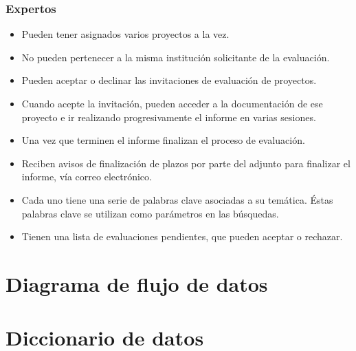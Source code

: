 \documentclass[12pt,a4paper,spanish,twoside]{book}
\begin{document}
\subsection{Expertos}
\begin{itemize}
\item Pueden tener asignados varios proyectos a la vez. 
\item No pueden pertenecer a la misma institución solicitante de la evaluación.
\item Pueden aceptar o declinar las invitaciones de evaluación de proyectos.
\item Cuando acepte la invitación, pueden acceder a la documentación de ese
  proyecto e ir realizando progresivamente el informe en varias sesiones. 
\item Una vez que terminen el informe finalizan el proceso de evaluación.
\item Reciben avisos de finalización de plazos por parte del adjunto para
  finalizar el informe, vía correo electrónico.
\item Cada uno tiene una serie de palabras clave asociadas a su
  temática. Éstas palabras clave se utilizan como parámetros en las
  búsquedas. 
\item Tienen una lista de evaluaciones pendientes, que pueden aceptar o 
  rechazar.
\end{itemize}

\chapter{Diagrama de flujo de datos}









\chapter{Diccionario de datos}
\end{document}
